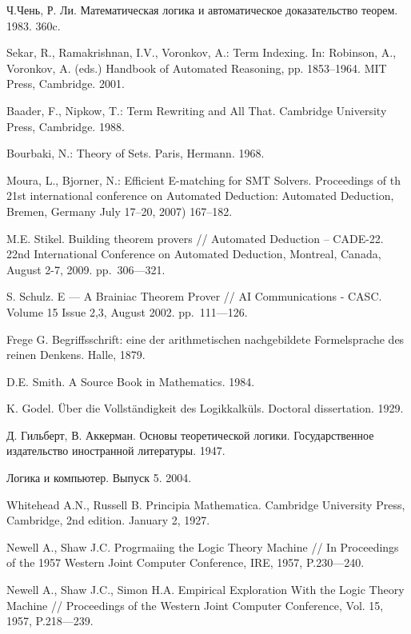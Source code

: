 \begin{thebibliography}{99}
 Ч.Чень, Р. Ли. Математическая логика и автоматическое доказательство теорем. 1983. 360c.

 Sekar, R., Ramakrishnan, I.V., Voronkov, A.: Term Indexing. In: Robinson, A., Voronkov, A. (eds.) Handbook of Automated Reasoning, pp. 1853--1964. MIT Press, Cambridge. 2001.

 Baader, F., Nipkow, T.: Term Rewriting and All That. Cambridge University Press, Cambridge. 1988.

 Bourbaki, N.: Theory of Sets. Paris, Hermann. 1968.

 Moura, L., Bjorner, N.: Efficient E-matching for SMT Solvers. Proceedings of th 21st international conference on Automated Deduction: Automated Deduction, Bremen, Germany July 17--20, 2007) 167--182.

 M.E. Stikel. Building theorem provers // Automated Deduction – CADE-22. 22nd International Conference on Automated Deduction, Montreal, Canada, August 2-7, 2009. pp.~306---321.

 S. Schulz. E --- A Brainiac Theorem Prover // AI Communications - CASC. Volume 15 Issue 2,3, August 2002. pp.~111---126.

 Frege G. Begriffsschrift: eine der arithmetischen nachgebildete Formelsprache des reinen Denkens. Halle, 1879.

 D.E. Smith. A Source Book in Mathematics. 1984.

 K. Godel. Über die Vollständigkeit des Logikkalküls. Doctoral dissertation. 1929.

 Д. Гильберт, В. Аккерман. Основы теоретической логики. Государственное издательство иностранной литературы. 1947.

 Логика и компьютер. Выпуск 5. 2004.

 Whitehead A.N., Russell B. Principia Mathematica. Cambridge University Press, Cambridge, 2nd edition. January 2, 1927.

 Newell A., Shaw J.C. Progrmaiing the Logic Theory Machine // In Proceedings of the 1957 Western Joint Computer Conference, IRE, 1957, P.230---240.

 Newell A., Shaw J.C., Simon H.A. Empirical Exploration With the Logic Theory Machine // Proceedings of the Western Joint Computer Conference, Vol. 15, 1957, P.218---239.


\end{thebibliography}
